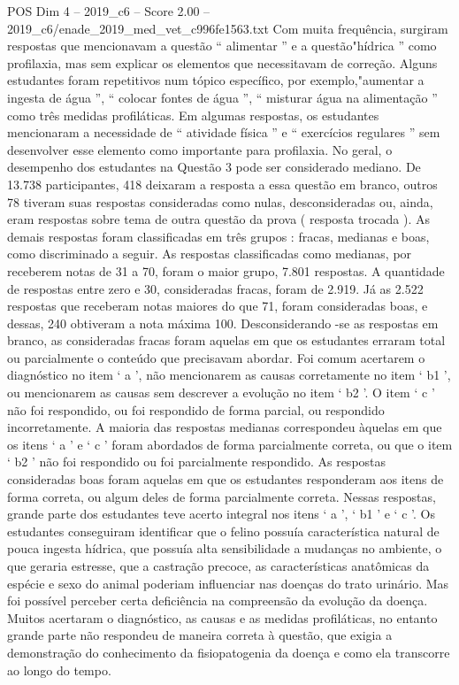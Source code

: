 \begin{textsample}{POS Dim 4 – 2019\_c6 – Score 2.00 – 2019\_c6/enade\_2019\_med\_vet\_c996fe1563.txt}
Com muita frequência, surgiram respostas que mencionavam a questão “ alimentar ” e a questão"hídrica ” como profilaxia, mas sem explicar os elementos que necessitavam de correção.
Alguns estudantes foram repetitivos num tópico específico, por exemplo,"aumentar a ingesta de água ”, “ colocar fontes de água ”, “ misturar água na alimentação ” como três medidas profiláticas.
Em algumas respostas, os estudantes mencionaram a necessidade de “ atividade física ” e “ exercícios regulares ” sem desenvolver esse elemento como importante para profilaxia.
No geral, o desempenho dos estudantes na Questão 3 pode ser considerado mediano.
De 13.738 participantes, 418 deixaram a resposta a essa questão em branco, outros 78 tiveram suas respostas consideradas como nulas, desconsideradas ou, ainda, eram respostas sobre tema de outra questão da prova ( resposta trocada ).
As demais respostas foram classificadas em três grupos : fracas, medianas e boas, como discriminado a seguir.
As respostas classificadas como medianas, por receberem notas de 31 a 70, foram o maior grupo, 7.801 respostas.
A quantidade de respostas entre zero e 30, consideradas fracas, foram de 2.919.
Já as 2.522 respostas que receberam notas maiores do que 71, foram consideradas boas, e dessas, 240 obtiveram a nota máxima 100.
Desconsiderando -se as respostas em branco, as consideradas fracas foram aquelas em que os estudantes erraram total ou parcialmente o conteúdo que precisavam abordar.
Foi comum acertarem o diagnóstico no item ‘ a ’, não mencionarem as causas corretamente no item ‘ b1 ’, ou mencionarem as causas sem descrever a evolução no item ‘ b2 ’.
O item ‘ c ’ não foi respondido, ou foi respondido de forma parcial, ou respondido incorretamente.
A maioria das respostas medianas correspondeu àquelas em que os itens ‘ a ’ e ‘ c ’ foram abordados de forma parcialmente correta, ou que o item ‘ b2 ’ não foi respondido ou foi parcialmente respondido.
As respostas consideradas boas foram aquelas em que os estudantes responderam aos itens de forma correta, ou algum deles de forma parcialmente correta.
Nessas respostas, grande parte dos estudantes teve acerto integral nos itens ‘ a ’, ‘ b1 ’ e ‘ c ’.
Os estudantes conseguiram identificar que o felino possuía característica natural de pouca ingesta hídrica, que possuía alta sensibilidade a mudanças no ambiente, o que geraria estresse, que a castração precoce, as características anatômicas da espécie e sexo do animal poderiam influenciar nas doenças do trato urinário.
Mas foi possível perceber certa deficiência na compreensão da evolução da doença.
Muitos acertaram o diagnóstico, as causas e as medidas profiláticas, no entanto grande parte não respondeu de maneira correta à questão, que exigia a demonstração do conhecimento da fisiopatogenia da doença e como ela transcorre ao longo do tempo.

\end{textsample}
